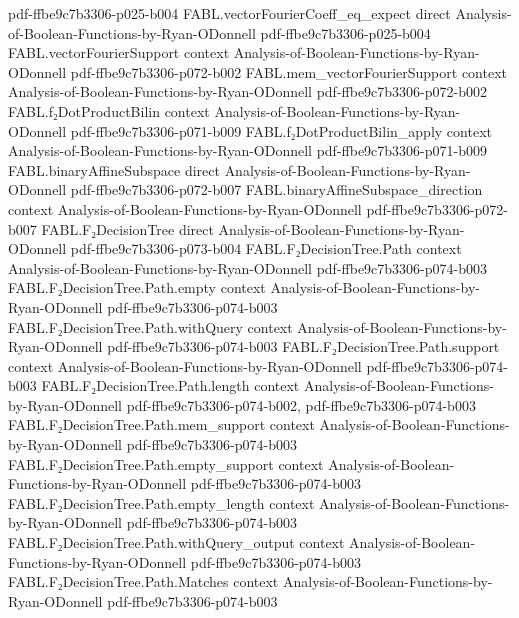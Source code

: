 \begin{theorem}
{    pdf-ffbe9c7b3306-p025-b004}
\proofstep
  {FABL.vectorFourierCoeff_eq_expect}
  {direct}
  {Analysis-of-Boolean-Functions-by-Ryan-ODonnell}
  {pdf-ffbe9c7b3306-p025-b004}
\proofstep
  {FABL.vectorFourierSupport}
  {context}
  {Analysis-of-Boolean-Functions-by-Ryan-ODonnell}
  {pdf-ffbe9c7b3306-p072-b002}
\proofstep
  {FABL.mem_vectorFourierSupport}
  {context}
  {Analysis-of-Boolean-Functions-by-Ryan-ODonnell}
  {pdf-ffbe9c7b3306-p072-b002}
\proofstep
  {FABL.f₂DotProductBilin}
  {context}
  {Analysis-of-Boolean-Functions-by-Ryan-ODonnell}
  {pdf-ffbe9c7b3306-p071-b009}
\proofstep
  {FABL.f₂DotProductBilin_apply}
  {context}
  {Analysis-of-Boolean-Functions-by-Ryan-ODonnell}
  {pdf-ffbe9c7b3306-p071-b009}
\proofstep
  {FABL.binaryAffineSubspace}
  {direct}
  {Analysis-of-Boolean-Functions-by-Ryan-ODonnell}
  {pdf-ffbe9c7b3306-p072-b007}
\proofstep
  {FABL.binaryAffineSubspace_direction}
  {context}
  {Analysis-of-Boolean-Functions-by-Ryan-ODonnell}
  {pdf-ffbe9c7b3306-p072-b007}
\proofstep
  {FABL.F₂DecisionTree}
  {direct}
  {Analysis-of-Boolean-Functions-by-Ryan-ODonnell}
  {pdf-ffbe9c7b3306-p073-b004}
\proofstep
  {FABL.F₂DecisionTree.Path}
  {context}
  {Analysis-of-Boolean-Functions-by-Ryan-ODonnell}
  {pdf-ffbe9c7b3306-p074-b003}
\proofstep
  {FABL.F₂DecisionTree.Path.empty}
  {context}
  {Analysis-of-Boolean-Functions-by-Ryan-ODonnell}
  {pdf-ffbe9c7b3306-p074-b003}
\proofstep
  {FABL.F₂DecisionTree.Path.withQuery}
  {context}
  {Analysis-of-Boolean-Functions-by-Ryan-ODonnell}
  {pdf-ffbe9c7b3306-p074-b003}
\proofstep
  {FABL.F₂DecisionTree.Path.support}
  {context}
  {Analysis-of-Boolean-Functions-by-Ryan-ODonnell}
  {pdf-ffbe9c7b3306-p074-b003}
\proofstep
  {FABL.F₂DecisionTree.Path.length}
  {context}
  {Analysis-of-Boolean-Functions-by-Ryan-ODonnell}
  {pdf-ffbe9c7b3306-p074-b002,
    pdf-ffbe9c7b3306-p074-b003}
\proofstep
  {FABL.F₂DecisionTree.Path.mem_support}
  {context}
  {Analysis-of-Boolean-Functions-by-Ryan-ODonnell}
  {pdf-ffbe9c7b3306-p074-b003}
\proofstep
  {FABL.F₂DecisionTree.Path.empty_support}
  {context}
  {Analysis-of-Boolean-Functions-by-Ryan-ODonnell}
  {pdf-ffbe9c7b3306-p074-b003}
\proofstep
  {FABL.F₂DecisionTree.Path.empty_length}
  {context}
  {Analysis-of-Boolean-Functions-by-Ryan-ODonnell}
  {pdf-ffbe9c7b3306-p074-b003}
\proofstep
  {FABL.F₂DecisionTree.Path.withQuery_output}
  {context}
  {Analysis-of-Boolean-Functions-by-Ryan-ODonnell}
  {pdf-ffbe9c7b3306-p074-b003}
\proofstep
  {FABL.F₂DecisionTree.Path.Matches}
  {context}
  {Analysis-of-Boolean-Functions-by-Ryan-ODonnell}
  {pdf-ffbe9c7b3306-p074-b003}
\proofstep

\end{theorem}
